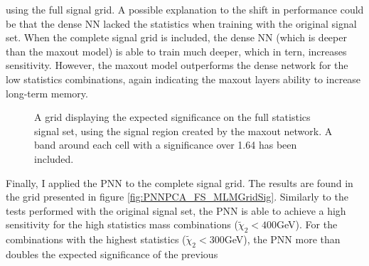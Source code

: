 using the full signal grid. A possible explanation to the shift in performance could be that the dense \ac{NN} lacked the statistics when training 
with the original signal set. When the complete signal grid is included, the dense \ac{NN} (which is deeper than the maxout model) is able to train 
much deeper, which in tern, increases sensitivity. However, the maxout model outperforms the dense network for the low statistics combinations, again 
indicating the maxout layers ability to increase long-term memory.\\
\begin{figure}
    \caption{A grid displaying the expected significance on the full statistics signal set, using the signal region 
    created by the maxout network. A band around each cell with a significance over 1.64 has been included.}
    \label{fig:MaxOutPCA_FS_MLMGridSig}
\end{figure}
Finally, I applied the \ac{PNN} to the complete signal grid. The results are found in the grid presented in figure \ref{fig:PNNPCA_FS_MLMGridSig}.
Similarly to the tests performed with the original signal set, the \ac{PNN} is able to achieve a high sensitivity for the high statistics mass combinations
($\tilde{\chi}_2<400$GeV). For the combinations with the highest statistics ($\tilde{\chi}_2<300$GeV), the \ac{PNN} more than doubles the expected significance of the previous 
